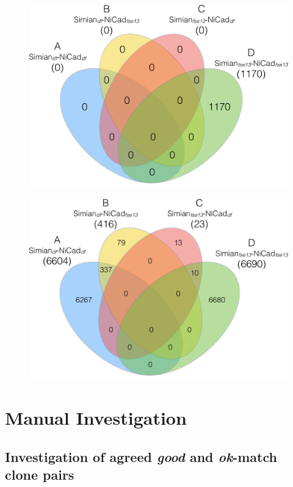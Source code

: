 \documentclass{IEEEtran}
\begin{document}
\begin{figure}
	\centering
	\begin{minipage}{.5\textwidth}
		\centering
		\includegraphics[width=0.7\linewidth]{venn4_pairs_good_new}
		\label{fig:venn4_new_good}
	\end{minipage}%
	\begin{minipage}{.5\textwidth}
		\centering
		\includegraphics[width=0.7\linewidth]{venn4_pairs_ok_new}
		\label{fig:venn4_new_ok}
	\end{minipage}
\end{figure}

\section*{Manual Investigation}

\subsection{Investigation of agreed \textit{good} and \textit{ok}-match clone pairs}
\end{document}
